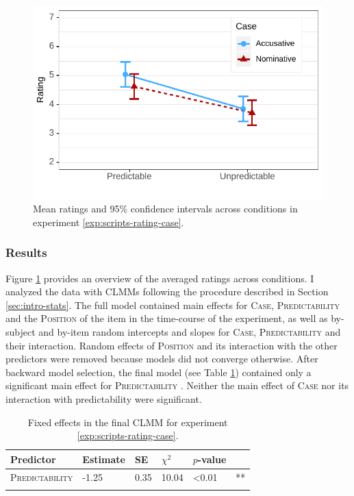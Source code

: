 \begin{figure}[t]
\includegraphics[scale=1]{figures/scripts_case_estimates}
\caption{Mean ratings and 95\% confidence intervals across conditions in experiment \ref{exp:scripts-rating-case}. \label{fig:scr-case-estimates}}
\end{figure}

\subsubsection{Results}
Figure \ref{fig:scr-case-estimates} provides an overview of the averaged ratings across conditions. I analyzed the data with CLMMs following the procedure described in Section \ref{sec:intro-stats}. The full model contained main effects for \textsc{Case}, \textsc{Predictability} and the \textsc{Position} of the item in the time-course of the experiment, as well as by-subject and by-item random intercepts and slopes for \textsc{Case}, \textsc{Predictability} and their interaction. Random effects of \textsc{Position} and its interaction with the other predictors were removed because models did not converge otherwise. After backward model selection, the final model (see Table \ref{tab:scripts-case-estimates}) contained only a significant main effect for \textsc{Predictability} . Neither the main effect of \textsc{Case}  nor its interaction with predictability  were significant.

\begin{table}[t]
\begin{tabular}{l l l l l l}
\lsptoprule
Predictor & Estimate & SE & $\chi^2$ &  $p$-value &  \\   
\midrule
\textsc{Predictability} & -1.25 &  0.35 & 10.04 & \textless 0.01 & ** \\
\lspbottomrule
\end{tabular}
\caption{Fixed effects in the final CLMM for experiment \ref{exp:scripts-rating-case}. \label{tab:scripts-case-estimates}}
\end{table}

